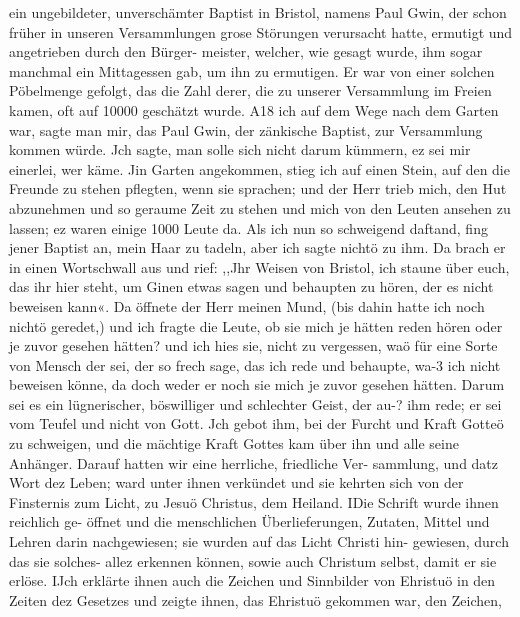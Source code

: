 ein ungebildeter, unverschämter Baptist in Bristol, namens Paul
Gwin, der schon früher in unseren Versammlungen grose Störungen
verursacht hatte, ermutigt und angetrieben durch den Bürger-
meister, welcher, wie gesagt wurde, ihm sogar manchmal ein
Mittagessen gab, um ihn zu ermutigen. Er war von einer
solchen Pöbelmenge gefolgt, das die Zahl derer, die zu unserer
Versammlung im Freien kamen, oft auf 10000 geschätzt wurde.
A18 ich auf dem Wege nach dem Garten war, sagte man mir,
das Paul Gwin, der zänkische Baptist, zur Versammlung kommen
würde. Jch sagte, man solle sich nicht darum kümmern, ez sei
mir einerlei, wer käme. Jin Garten angekommen, stieg ich auf
einen Stein, auf den die Freunde zu stehen pflegten, wenn sie
sprachen; und der Herr trieb mich, den Hut abzunehmen und so
geraume Zeit zu stehen und mich von den Leuten ansehen zu
lassen; ez waren einige 1000 Leute da. Als ich nun so schweigend
daftand, fing jener Baptist an, mein Haar zu tadeln, aber ich
sagte nichtö zu ihm. Da brach er in einen Wortschwall aus und
rief: ,,Jhr Weisen von Bristol, ich staune über euch, das ihr hier
steht, um Ginen etwas sagen und behaupten zu hören, der es
nicht beweisen kann«. Da öffnete der Herr meinen Mund, (bis
dahin hatte ich noch nichtö geredet,) und ich fragte die Leute, ob
sie mich je hätten reden hören oder je zuvor gesehen hätten? und
ich hies sie, nicht zu vergessen, waö für eine Sorte von Mensch
der sei, der so frech sage, das ich rede und behaupte, wa-3 ich
nicht beweisen könne, da doch weder er noch sie mich je zuvor
gesehen hätten. Darum sei es ein lügnerischer, böswilliger und
schlechter Geist, der au-? ihm rede; er sei vom Teufel und nicht
von Gott. Jch gebot ihm, bei der Furcht und Kraft Gotteö zu
schweigen, und die mächtige Kraft Gottes kam über ihn und alle
seine Anhänger. Darauf hatten wir eine herrliche, friedliche Ver-
sammlung, und datz Wort dez Leben; ward unter ihnen verkündet
und sie kehrten sich von der Finsternis zum Licht, zu Jesuö
Christus, dem Heiland. IDie Schrift wurde ihnen reichlich ge-
öffnet und die menschlichen Überlieferungen, Zutaten, Mittel und
Lehren darin nachgewiesen; sie wurden auf das Licht Christi hin-
gewiesen, durch das sie solches- allez erkennen können, sowie auch
Christum selbst, damit er sie erlöse. IJch erklärte ihnen auch die
Zeichen und Sinnbilder von Ehristuö in den Zeiten dez Gesetzes
und zeigte ihnen, das Ehristuö gekommen war, den Zeichen,


